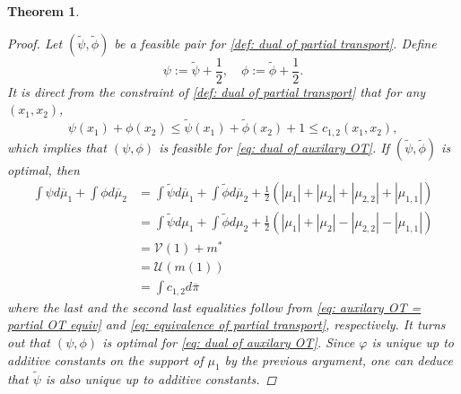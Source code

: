 \documentclass{amsart}
\theoremstyle{plain}
\numberwithin{equation}{section}\newtheorem{theorem}{Theorem}[section]
\theoremstyle{remark}
\newcommand{\spt}{\textup{spt}}
\begin{document}
\begin{theorem}
\begin{proof}
Let $(\tilde{\psi}, \tilde{\phi})$ be a feasible pair for \eqref{def: dual of partial transport}. %
Define
\[
    \psi:= \tilde{\psi} + \frac{1}{2}, \quad 
    \phi:= \tilde{\phi} + \frac{1}{2}.
\]
It is direct from the constraint of \eqref{def: dual of partial transport} that for any $(x_1, x_2)$,
\[
    \psi(x_1)+ \phi(x_2) \leq \tilde{\psi}(x_1) + \tilde{\phi}(x_2) + 1 \leq c_{1,2}(x_1, x_2),
\]
which implies that $(\psi, \phi)$ is feasible for \eqref{eq: dual of auxilary OT}. If $(\tilde{\psi}, \tilde{\phi})$ is optimal, then
\begin{align*}
    \int \psi d\overline{\mu}_1 + \int \phi d\overline{\mu}_2 
    &= \int \tilde{\psi} d\overline{\mu}_1 + \int \tilde{\phi} d\overline{\mu}_2 + \frac{1}{2}\left(|\mu_1| + |\mu_2| + |\mu_{2,2}| + |\mu_{1,1}| \right)\\ 
    &= \int \tilde{\psi} d\mu_1 + \int \tilde{\phi} d\mu_2 + \frac{1}{2}\left(|\mu_1| + |\mu_2| - |\mu_{2,2}| -|\mu_{1,1}| \right)\\
    &= \mathcal{V}(1) + m^* \\
    &= \mathcal{U}(m(1))\\
    &= \int c_{1,2} d\overline{\pi}
\end{align*}
where the last and the second last equalities follow from \eqref{eq: auxilary OT = partial OT equiv} and \eqref{eq: equivalence of partial transport}, respectively. It turns out that $(\psi, \phi)$ is optimal for \eqref{eq: dual of auxilary OT}. Since $\varphi$ is unique up to additive constants on the support of $\mu_1$ by the previous argument, one can deduce that $\tilde{\psi}$ is also unique up to additive constants. %





\end{proof}
\end{theorem}
\end{document}

